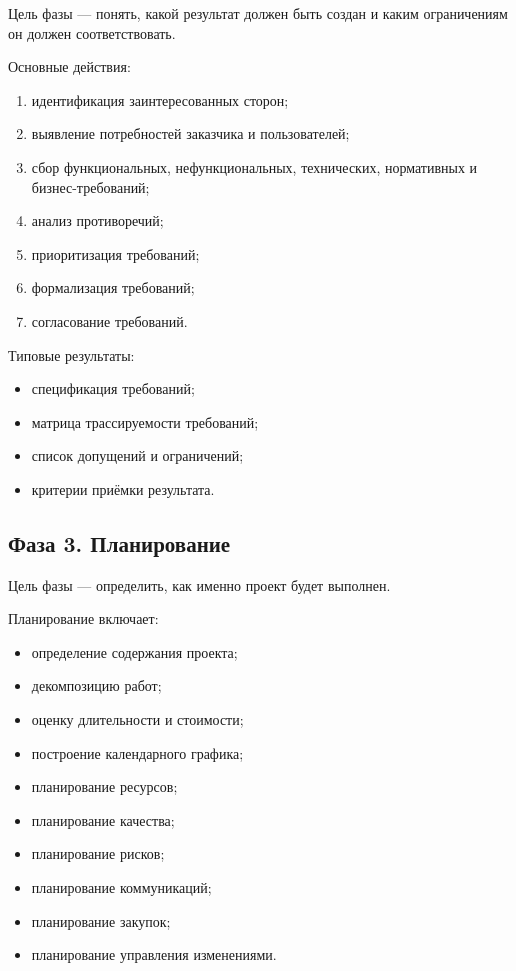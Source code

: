 \documentclass[12pt,a4paper]{article}
\begin{document}
Цель фазы --- понять, какой результат должен быть создан и каким ограничениям он должен соответствовать.

Основные действия:
\begin{enumerate}
    \item идентификация заинтересованных сторон;
    \item выявление потребностей заказчика и пользователей;
    \item сбор функциональных, нефункциональных, технических, нормативных и бизнес-требований;
    \item анализ противоречий;
    \item приоритизация требований;
    \item формализация требований;
    \item согласование требований.
\end{enumerate}

Типовые результаты:
\begin{itemize}
    \item спецификация требований;
    \item матрица трассируемости требований;
    \item список допущений и ограничений;
    \item критерии приёмки результата.
\end{itemize}

\subsection{Фаза 3. Планирование}

Цель фазы --- определить, как именно проект будет выполнен.

Планирование включает:
\begin{itemize}
    \item определение содержания проекта;
    \item декомпозицию работ;
    \item оценку длительности и стоимости;
    \item построение календарного графика;
    \item планирование ресурсов;
    \item планирование качества;
    \item планирование рисков;
    \item планирование коммуникаций;
    \item планирование закупок;
    \item планирование управления изменениями.
\end{itemize}
\end{document}

